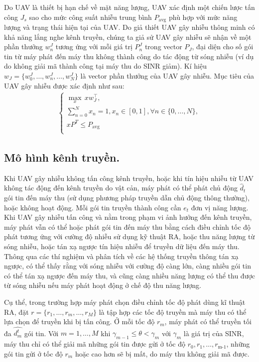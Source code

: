 \documentclass{uetgraduation}
\begin{document}
Do UAV là thiết bị hạn chế về mặt năng lượng, UAV xác định một chiến lược tấn công $J_s$ sao cho mức công suất nhiễu trung bình $P_\text{avg}$ phù hợp với mức năng lượng và trạng thái hiện tại của UAV.
Do giả thiết UAV gây nhiễu thông minh có khả năng lắng nghe kênh truyền, chúng ta giả sử UAV gây nhiễu sẽ nhận về một phần thưởng $w_n^J$ tương ứng với mỗi giá trị $P_n^J$ trong vector $P_J$, đại diện
cho số gói tin từ máy phát đến máy thu không thành công do tác động từ sóng nhiễu (ví dụ do không giải mã thành công tại máy thu do SINR giảm). Kí hiệu $w_J = \{w_0^J, \dots, w_n^J, \dots, w_N^J\}$
là vector phần thưởng của UAV gây nhiễu. Mục tiêu của UAV gây nhiễu được xác định như sau:
\begin{align*}
    \begin{cases}
        \underset{x}{\max} \, x w_J^\top, \\
        \sum_{n=0}^{N} x_n = 1, x_n \in [0, 1], \forall n \in \{0, \dots, N\}, \\
        x P^T \leq P_\text{avg} \\
    \end{cases}
\end{align*}

\subsection{Mô hình kênh truyền.}
Khi UAV gây nhiễu không tấn công kênh truyền, hoặc khi tín hiệu nhiễu từ UAV không tác động đến kênh truyền do vật cản, máy phát có thể phát chủ động $\hat{d}_t$
gói tin đến máy thu (sử dụng phương pháp truyền dẫn chủ động thông thường), hoặc không hoạt động. Mỗi gói tin truyền thành công cần $e_t$ đơn vị năng lượng.
Khi UAV gây nhiễu tấn công và nằm trong phạm vi ảnh hưởng đến kênh truyền, máy phát vẫn có thể hoặc phát gói tin đến máy thu bằng cách điều chỉnh tốc độ phát tương
ứng với cường độ nhiễu sử dụng kỹ thuật RA, hoặc thu năng lượng từ sóng nhiễu, hoặc tán xạ ngược tín hiệu nhiễu để truyền dữ liệu đến máy thu. Thông qua các thí nghiệm
và phân tích về các hệ thống truyền thông tán xạ ngược, có thể thấy rằng với sóng nhiễu với cường độ càng lớn, càng nhiều gói tin có thể tán xạ ngược đến máy thu, và cũng
càng nhiều năng lượng có thể thu được từ sóng nhiễu nếu máy phát hoạt động ở chế độ thu năng lượng. 

Cụ thể, trong trường hợp máy
phát chọn điều chỉnh tốc độ phát dùng kĩ thuật RA, đặt $r = \{r_1, \dots, r_m,\dots, r_M\}$ là tập hợp các tốc độ truyền mà máy thu có thể lựa chọn để truyền khi bị tấn
công. Ở mỗi tốc độ $r_m$, máy phát có thể truyền tối đa $\hat{d_m^t}$ gói tin. Với $m = 1, \dots, M$ khi $\gamma_{m-1} \leq \theta < \gamma_m$ với $\gamma_m$ là giá
trị của SINR, máy thu chỉ có thể giải mã những gói tin được gửi ở tốc độ $r_0, r_1, \dots, r_\text{m-1}$, những gói tin gửi ở tốc độ $r_m$ hoặc cao hơn sẽ bị mất,
do máy thu không giải mã được. 
\end{document}
